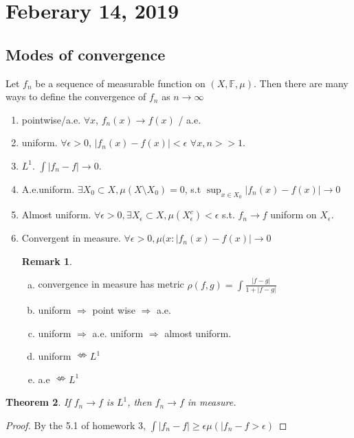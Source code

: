 \documentclass{article}
\newtheorem{theorem}{Theorem}[section]
\theoremstyle{definition}
\newtheorem{remark}[theorem]{Remark}
\begin{document}
\section{Feberary 14, 2019}

\subsection{Modes of convergence}

Let $f_n$ be a sequence of measurable function on $(X,\mathbb{F},\mu)$. Then there are many ways to define the convergence of $f_n$ as $n\rightarrow \infty$

\begin{enumerate}[1)]
	\item pointwise/a.e. $\forall x$, $f_n(x)\rightarrow f(x)$ / a.e.
	\item uniform. $\forall \epsilon>0$, $|f_n(x)-f(x)|<\epsilon$ $\forall x, n>>1$.
	\item $L^1$. $\int |f_n-f| \rightarrow 0$.
	\item A.e.uniform. $\exists X_0\subset X,\mu(X\setminus X_0)=0$, s.t $\sup_{x\in X_0} |f_n(x)-f(x)|\rightarrow 0$
	\item Almost uniform. $\forall \epsilon>0, \exists X_{\epsilon}\subset X, \mu(X_{\epsilon}^{c})<\epsilon$ s.t. $f_n \rightarrow f$ uniform on $X_{\epsilon}$.
	\item Convergent in measure. $\forall \epsilon>0, \mu(x:|f_n(x)-f(x)|\rightarrow 0$
	
\begin{remark}
	\begin{enumerate}[(a)]
		\item convergence in measure has metric $\rho(f,g)=\int \frac{|f-g|}{1+|f-g|}$
		\item uniform $\Rightarrow$ point wise $\Rightarrow$ a.e.
		\item uniform $\Rightarrow$ a.e. uniform $\Rightarrow$ almost uniform.
		\item uniform $\nLeftrightarrow L^1$
		\item a.e $\nLeftrightarrow L^1$
	\end{enumerate}
\end{remark}
\end{enumerate}

\begin{theorem}
	If $f_n \rightarrow f$ is $L^1$, then $f_n \rightarrow f$ in measure.
\end{theorem}

\begin{proof}
	By the 5.1 of homework 3, $\int |f_n-f| \geq \epsilon \mu(|f_n-f>\epsilon)$
\end{proof}
\end{document}
